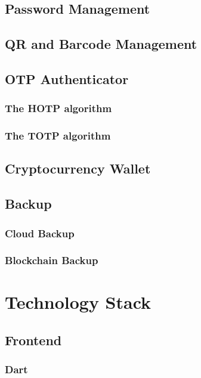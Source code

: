 \documentclass[a4paper,12pt]{report}
\begin{document}
\section{Password Management}

\section{QR and Barcode Management}

\section{OTP Authenticator}

\subsection{The HOTP algorithm}

\subsection{The TOTP algorithm}

\section{Cryptocurrency Wallet}

\section{Backup}

\subsection{Cloud Backup}

\subsection{Blockchain Backup}

\chapter{Technology Stack}

\section{Frontend}

\subsection{Dart}
\end{document}
